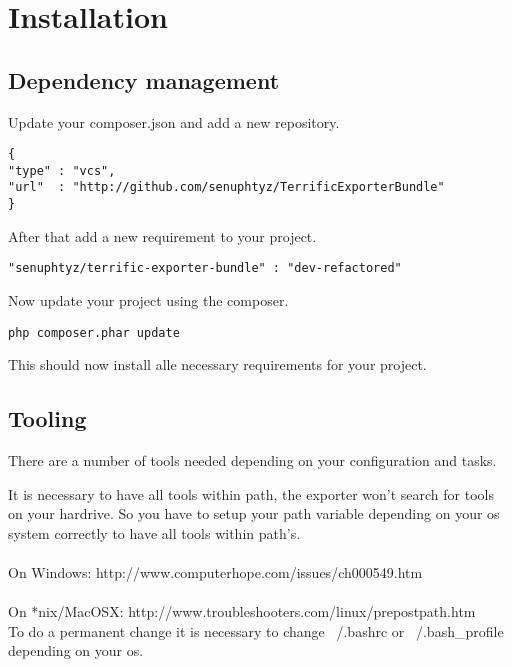 
\section{Installation}

\subsection{Dependency management}
Update your composer.json and add a new repository. \\

\begin{verbatim}
{
"type" : "vcs",
"url"  : "http://github.com/senuphtyz/TerrificExporterBundle"
}
\end{verbatim}

\noindent After that add a new requirement to your project. \\

\begin{verbatim}
"senuphtyz/terrific-exporter-bundle" : "dev-refactored"
\end{verbatim}
\noindent Now update your project using the composer. \\

\begin{verbatim}
php composer.phar update
\end{verbatim}
\noindent This should now install alle necessary requirements for your project. \\

\subsection{Tooling}
There are a number of tools needed depending on your configuration and tasks.\\

\begin{itemize}
\end{itemize} 

\noindent It is necessary to have all tools within path, the exporter won't search for tools on your hardrive. So you have to setup your path variable depending on your os system correctly to have all tools within path's.\\
\\
On Windows: http://www.computerhope.com/issues/ch000549.htm\\
\\
On *nix/MacOSX: http://www.troubleshooters.com/linux/prepostpath.htm\\
To do a permanent change it is necessary to change ~/.bashrc or ~/.bash\_profile depending on your os.

